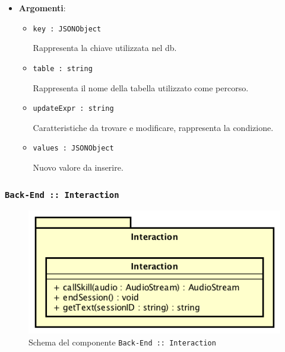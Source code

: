 \documentclass[../DefinizioneDiProdotto.tex]{subfiles}
\begin{document}
\begin{itemize}
\begin{itemize}
\begin{itemize}
	\item \textbf{Argomenti}:
	\begin{itemize}
	\item \texttt{key : JSONObject}\

	 Rappresenta la chiave utilizzata nel db.
	\item \texttt{table : string}\

	 Rappresenta il nome della tabella utilizzato come percorso.
	\item \texttt{updateExpr : string}\

	 Caratteristiche da trovare e modificare, rappresenta la condizione.
	\item \texttt{values : JSONObject}\

	 Nuovo valore da inserire.
	\end{itemize}
	\end{itemize}\vspace{0.5em}
	\end{itemize}\end{itemize}

	\newpage
	\subsubsection{ \texttt{Back-End :: Interaction}}
	\begin{figure}[!h]
		\centering
		\includegraphics[scale=0.7]{Architettura/Back-End/Interaction.png}
		\caption{Schema del componente \texttt{Back-End :: Interaction}}
	\end{figure}
\end{document}
